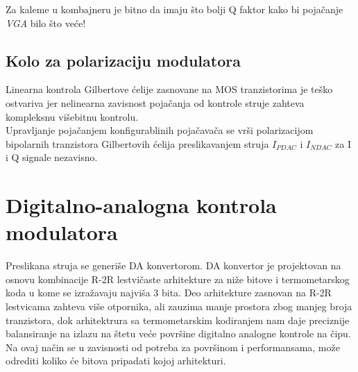 \documentclass[journal,twocolumn,letterpaper]{IEEEJERM}
\begin{document}

Za kaleme u kombajneru je bitno da imaju što bolji Q faktor kako bi pojačanje \textit{VGA} bilo što veće!


\subsection{Kolo za polarizaciju modulatora}

Linearna kontrola Gilbertove ćelije zasnovane na MOS tranzistorima je teško ostvariva jer nelinearna zavisnost pojačanja od kontrole struje zahteva kompleksnu višebitnu kontrolu. \\

Upravljanje pojačanjem konfigurablinih pojačavača se vrši polarizacijom bipolarnih tranzistora Gilbertovih ćelija preslikavanjem struja $I_{PDAC}$ i  $I_{NDAC}$ za I i Q signale nezavisno. \\



\section{Digitalno-analogna kontrola modulatora}


Preslikana struja se generiše DA konvertorom. DA konvertor je projektovan na osnovu kombinacije R-2R lestvičaste arhitekture za niže bitove i termometarskog koda u kome se izražavaju najviša 3 bita. Deo arhitekture zasnovan na R-2R lestvicama zahteva više otpornika, ali zauzima manje prostora zbog manjeg broja tranzistora, dok arhitektrura sa termometarskim kodiranjem nam daje preciznije balansiranje na izlazu na štetu veće površine digitalno analogne kontrole na čipu. Na ovaj način se u zavisnosti od potreba za površinom i performansama, može odrediti koliko će bitova pripadati kojoj arhitekturi. \\
\end{document}
